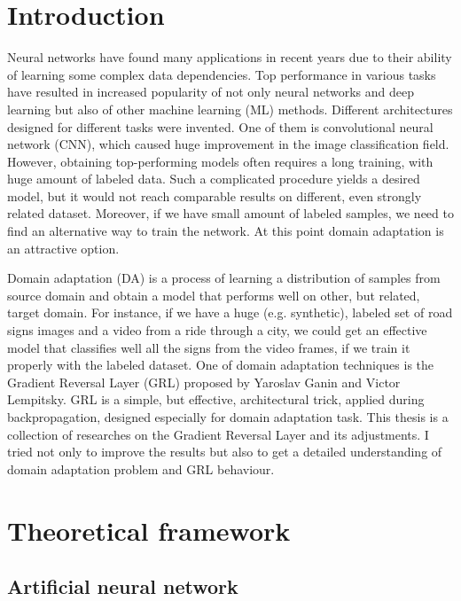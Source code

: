 \documentclass{article}
\begin{document}
\section{Introduction}
Neural networks have found many applications in recent years due to their ability of learning some complex data dependencies. Top performance in various tasks have resulted in increased popularity of not only neural networks and deep learning but also of other machine learning (ML) methods. Different architectures designed for different tasks were invented. One of them is convolutional neural network (CNN), which caused huge improvement in the image classification field. However, obtaining top-performing models often requires a long training, with huge amount of labeled data. Such a complicated procedure yields a desired model, but it would not reach comparable results on different, even strongly related dataset. Moreover, if we  have small amount of labeled samples, we need to find an alternative way to train the network. At this point domain adaptation is an attractive option.
\par
Domain adaptation (DA) is a process of learning a distribution of samples from source domain and obtain a model that performs well on other, but related, target domain. For instance, if we have a huge (e.g. synthetic), labeled set of road signs images and a video from a ride through a city, we could get an effective model that classifies well all the signs from the video frames, if we train it properly with the labeled dataset. One of domain adaptation techniques is the Gradient Reversal Layer (GRL) proposed by Yaroslav Ganin and Victor Lempitsky. GRL is a simple, but effective, architectural trick, applied during backpropagation, designed especially for domain adaptation task. This thesis is a collection of researches on the Gradient Reversal Layer and its adjustments. I tried not only to improve the results but also to get a detailed understanding of domain adaptation problem and GRL behaviour.

\section{Theoretical framework}
\subsection{Artificial neural network}
\end{document}
